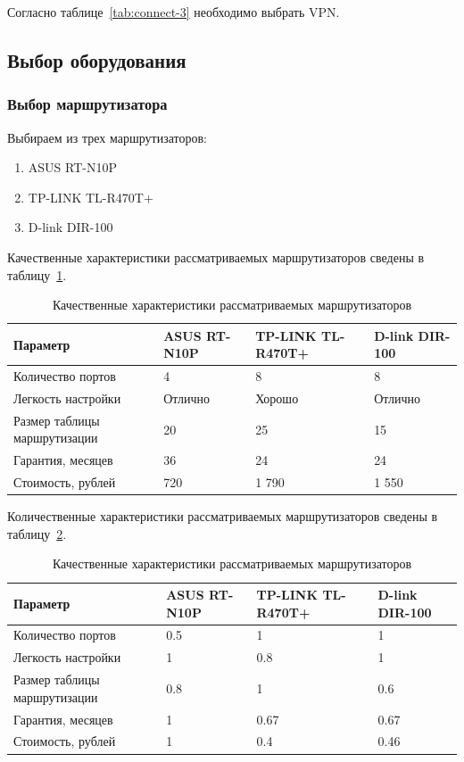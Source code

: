 \documentclass[russian,utf8,emptystyle]{eskdtext}
\begin{document}
Согласно таблице~\ref{tab:connect-3} необходимо выбрать VPN. 

\clearpage
\subsection{Выбор оборудования}
\subsubsection{Выбор маршрутизатора}

Выбираем из трех маршрутизаторов:
\begin{enumerate}[label=\arabic*.]
\item ASUS RT-N10P
\item TP-LINK TL-R470T+
\item D-link DIR-100
\end{enumerate}

Качественные характеристики рассматриваемых маршрутизаторов сведены в таблицу~\ref{tab:routers-1}.

\begin{longtable}{p{7cm}|p{2cm}|p{2cm}|p{2cm}}
\caption{Качественные характеристики рассматриваемых маршрутизаторов}
\label{tab:routers-1} \\
Параметр                     & ASUS RT-N10P & TP-LINK TL-R470T+ & D-link DIR-100 \\ 
\hline 
Количество портов            & 4         & 8      & 8  \\ 
Легкость настройки           & Отлично   & Хорошо & Отлично  \\ 
Размер таблицы маршрутизации & 20        & 25     & 15  \\ 
Гарантия, месяцев            & 36        & 24     & 24  \\ 
Стоимость, рублей            & 720       & 1 790  & 1 550 \\
\end{longtable}

Количественные характеристики рассматриваемых маршрутизаторов сведены в таблицу~\ref{tab:routers-2}.

\begin{longtable}{p{7cm}|p{2cm}|p{2cm}|p{2cm}}
\caption{Качественные характеристики рассматриваемых маршрутизаторов}
\label{tab:routers-2} \\
Параметр                     & ASUS RT-N10P & TP-LINK TL-R470T+ & D-link DIR-100 \\ 
\hline 
Количество портов            & 0.5       & 1      & 1  \\ 
Легкость настройки           & 1         & 0.8    & 1  \\ 
Размер таблицы маршрутизации & 0.8       & 1      & 0.6  \\ 
Гарантия, месяцев            & 1         & 0.67   & 0.67  \\ 
Стоимость, рублей            & 1         & 0.4    & 0.46 \\
\end{longtable}
\end{document}
